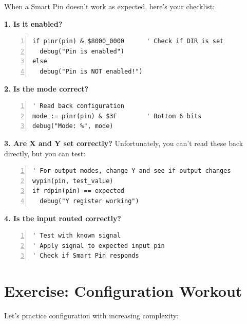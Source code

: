 \documentclass[11pt,a4paper,oneside,english]{book}
\begin{document}
When a Smart Pin doesn't work as expected, here's your checklist:

\textbf{1. Is it enabled?}

\begin{Spin2Block}
\begin{Verbatim}[numbers=left,numbersep=5pt,xleftmargin=15pt]
if pinr(pin) & $8000_0000      ' Check if DIR is set
  debug("Pin is enabled")
else
  debug("Pin is NOT enabled!")
\end{Verbatim}
\end{Spin2Block}

\textbf{2. Is the mode correct?}

\begin{Spin2Block}
\begin{Verbatim}[numbers=left,numbersep=5pt,xleftmargin=15pt]
' Read back configuration
mode := pinr(pin) & $3F        ' Bottom 6 bits
debug("Mode: %", mode)
\end{Verbatim}
\end{Spin2Block}

\textbf{3. Are X and Y set correctly?} Unfortunately, you can't read
these back directly, but you can test:

\begin{Spin2Block}
\begin{Verbatim}[numbers=left,numbersep=5pt,xleftmargin=15pt]
' For output modes, change Y and see if output changes
wypin(pin, test_value)
if rdpin(pin) == expected
  debug("Y register working")
\end{Verbatim}
\end{Spin2Block}

\textbf{4. Is the input routed correctly?}

\begin{Spin2Block}
\begin{Verbatim}[numbers=left,numbersep=5pt,xleftmargin=15pt]
' Test with known signal
' Apply signal to expected input pin
' Check if Smart Pin responds
\end{Verbatim}
\end{Spin2Block}

\hypertarget{exercise-configuration-workout}{%
\section{Exercise: Configuration
Workout}\label{exercise-configuration-workout}}

Let's practice configuration with increasing complexity:
\end{document}
